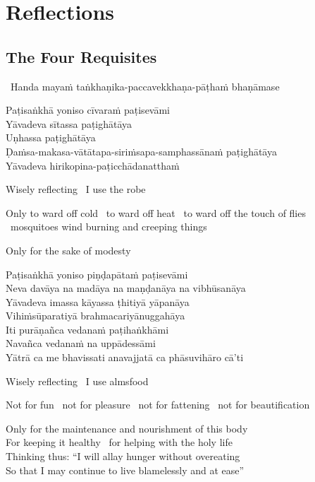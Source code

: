 \ifdesktopversion
{}
\else
{}
\fi

\chapter{Reflections}

\section{The Four Requisites}
\label{four-requisites}

\begin{leader}
  \anglebracketleft\ \hspace{-0.5mm}Handa mayaṁ taṅkhaṇika-paccavekkhaṇa-pāṭhaṁ bhaṇāmase \hspace{-0.5mm}\anglebracketright\
\end{leader}

Paṭisaṅkhā yoniso cīvaraṁ paṭisevāmi\\
Yāvadeva sītassa paṭighātāya\\
Uṇhassa paṭighātāya\\
Ḍaṁsa-makasa-vātātapa-siriṁsapa-samphassānaṁ paṭighātāya\\
Yāvadeva hirikopina-paṭicchādanatthaṁ

\begin{english-keepwith}
  Wisely reflecting \breathmark\ I use the robe
  \begin{english-hangtogether}
    Only to ward off cold \breathmark\ to ward off heat \breathmark\ to ward off the touch of flies \breathmark\ mosquitoes wind burning and creeping things
  \end{english-hangtogether}
  Only for the sake of modesty
\end{english-keepwith}

Paṭisaṅkhā yoniso piṇḍapātaṁ paṭisevāmi\\
Neva davāya na madāya na maṇḍanāya na vibhūsanāya\\
Yāvadeva imassa kāyassa ṭhitiyā yāpanāya\\
Vihiṁsūparatiyā brahmacariyānuggahāya\\
Iti purāṇañca vedanaṁ paṭihaṅkhāmi\\
Navañca vedanaṁ na uppādessāmi\\
Yātrā ca me bhavissati anavajjatā ca phāsuvihāro cā'ti

\begin{english-keepwith}
  Wisely reflecting \breathmark\ I use almsfood
  \begin{english-hangtogether}
    Not for fun \breathmark\ not for pleasure \breathmark\ not for fattening \breathmark\ not for beautification
  \end{english-hangtogether}
  Only for the maintenance and nourishment of this body\\
  For keeping it healthy \breathmark\ for helping with the holy life\\
  Thinking thus: ``I will allay hunger without overeating\\
  So that I may continue to live blamelessly and at ease''
\end{english-keepwith}

